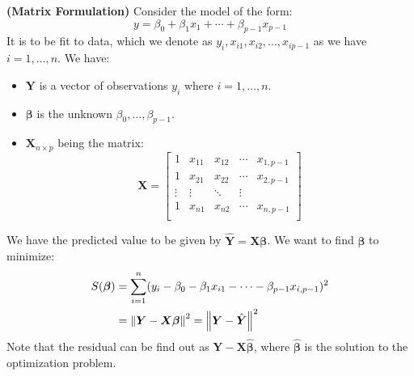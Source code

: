 \begin{remark}{\textbf{(Matrix Formulation)}}
    Consider the model of the form:
    \begin{equation*}
        y = \beta_0 + \beta_1x_1 + \cdots + \beta_{p-1}x_{p-1}
    \end{equation*}
    It is to be fit to data, which we denote as $y_i, x_{i1},x_{i2},\dots,x_{ip-1}$ as we have $i=1,\dots,n$. We have:
    \begin{itemize}
        \item $\boldsymbol Y$ is a vector of observations $y_i$ where $i=1,\dots,n$.
        \item $\boldsymbol \beta$ is the unknown $\beta_0, \dots,\beta_{p-1}$. 
        \item $\boldsymbol X_{n\times p}$ being the matrix:
        \begin{equation*}
            \boldsymbol X = \begin{bmatrix}
                1 & x_{11} & x_{12} & \cdots & x_{1,p-1} \\
                1 & x_{21} & x_{22} & \cdots & x_{2,p-1} \\
                \vdots & \vdots & \ddots & \vdots \\
                1 & x_{n1} & x_{n2} & \cdots & x_{n,p-1} \\
            \end{bmatrix}
        \end{equation*}
    \end{itemize}
    We have the predicted value to be given by $\hat{\boldsymbol Y} = \boldsymbol X\boldsymbol \beta$.  We want to find $\boldsymbol \beta$ to minimize:
    \begin{equation*}
    \begin{aligned}
        S(\boldsymbol \beta) &= \sum^n_{i=1}(y_i - \beta_0 - \beta_1x_{i1} - \cdots - \beta_{p-1}x_{i,p-1})^2 \\
        &= \left\lVert\boldsymbol Y - \boldsymbol X\boldsymbol \beta\right\rVert^2 = \left\lVert\boldsymbol Y - \hat{\boldsymbol Y}\right\rVert^2
    \end{aligned}
    \end{equation*}
    Note that the residual can be find out as $\boldsymbol Y - \boldsymbol X\hat{\boldsymbol \beta}$, where $\hat{\boldsymbol \beta}$ is the solution to the optimization problem.
\end{remark}

